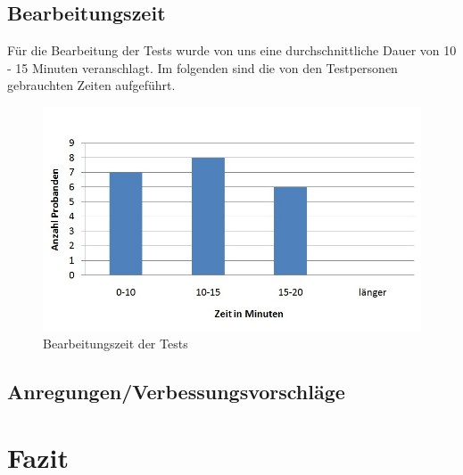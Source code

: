 \subsection{Bearbeitungszeit}
Für die Bearbeitung der Tests wurde von uns eine durchschnittliche Dauer von 10 - 15 Minuten veranschlagt. Im folgenden sind die 
von den Testpersonen gebrauchten Zeiten aufgeführt.\\

\begin{figure}[h]
\centering
\includegraphics[width=0.7\linewidth]{img/Gesamtzeit}
\caption{Bearbeitungszeit der Tests}
\label{fig:Gesamtzeit}
\end{figure}
\newpage



\subsection{Anregungen/Verbessungsvorschläge}

\section{Fazit}